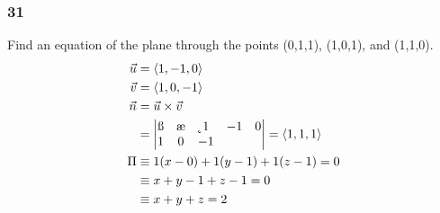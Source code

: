 \documentclass{math}
\begin{document}
\subsubsection*{31}
Find an equation of the plane through the points (0,1,1), (1,0,1), and (1,1,0).
\begin{align*}
  \vec{u} &= \langle1,-1,0\rangle \\
  \vec{v} &= \langle1,0,-1\rangle \\
  \vec{n} &= \vec{u}\times\vec{v} \\
  &= \begin{vmatrix}
    \i & \j & \k \\
    1 & -1 & 0 \\
    1 & 0 & -1
  \end{vmatrix} = \langle1,1,1\rangle \\
  \Pi &\equiv 1(x-0)+1(y-1)+1(z-1) = 0 \\
  &\equiv x+y-1+z-1 = 0 \\
  &\equiv x+y+z = 2
\end{align*}
\end{document}
